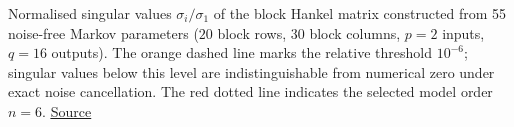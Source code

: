 Normalised singular values $\sigma_i / \sigma_1$ of the block Hankel matrix constructed from 55 noise-free Markov parameters ($20$ block rows, $30$ block columns, $p = 2$ inputs, $q = 16$ outputs). The orange dashed line marks the relative threshold $10^{-6}$; singular values below this level are indistinguishable from numerical zero under exact noise cancellation. The red dotted line indicates the selected model order $n = 6$. \href{https://github.com/tahmidazam/gg4/blob/main/notebooks/model_order/model_order.ipynb}{\underline{Source}}%